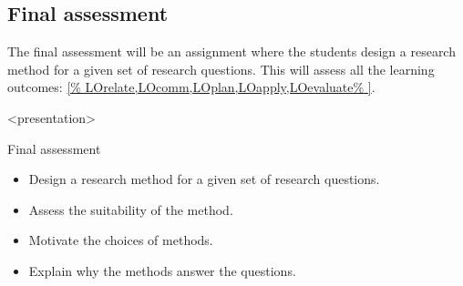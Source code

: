 %
%
%

\subsection{Final assessment}

The final assessment will be an assignment where the students design a research 
method for a given set of research questions.
This will assess all the learning outcomes: \cref{%
  LOrelate,LOcomm,LOplan,LOapply,LOevaluate%
}.

\begin{frame}<presentation>
  \begin{block}{Final assessment}
    \begin{itemize}
      \item Design a research method for a given set of research questions.
      \item Assess the suitability of the method.
      \item Motivate the choices of methods.
      \item Explain why the methods answer the questions.
    \end{itemize}
  \end{block}
\end{frame}

